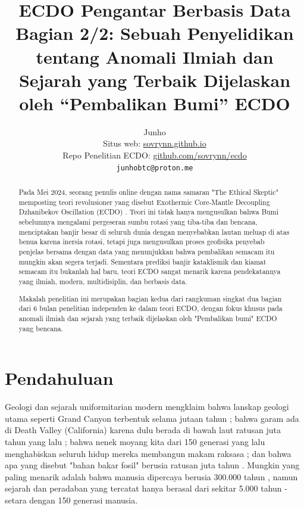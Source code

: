 \documentclass[10pt,twocolumn,letterpaper]{article}
\begin{document}
\title{ECDO Pengantar Berbasis Data Bagian 2/2: Sebuah Penyelidikan tentang Anomali Ilmiah dan Sejarah yang Terbaik Dijelaskan oleh “Pembalikan Bumi” ECDO}

\author{Junho\\
Situs web: \href{https://sovrynn.github.io}{sovrynn.github.io}\\
Repo Penelitian ECDO: \href{https://github.com/sovrynn/ecdo}{github.com/sovrynn/ecdo}\\
{\tt\small junhobtc@proton.me}
}

\maketitle

\begin{abstract}
Pada Mei 2024, seorang penulis online dengan nama samaran "The Ethical Skeptic" \cite{0} memposting teori revolusioner yang disebut Exothermic Core-Mantle Decoupling Dzhanibekov Oscillation (ECDO) \cite{1}. Teori ini tidak hanya mengusulkan bahwa Bumi sebelumnya mengalami pergeseran sumbu rotasi yang tiba-tiba dan bencana, menciptakan banjir besar di seluruh dunia dengan menyebabkan lautan meluap di atas benua karena inersia rotasi, tetapi juga mengusulkan proses geofisika penyebab penjelas bersama dengan data yang menunjukkan bahwa pembalikan semacam itu mungkin akan segera terjadi. Sementara prediksi banjir kataklismik dan kiamat semacam itu bukanlah hal baru, teori ECDO sangat menarik karena pendekatannya yang ilmiah, modern, multidisiplin, dan berbasis data.

Makalah penelitian ini merupakan bagian kedua dari rangkuman singkat dua bagian dari 6 bulan penelitian independen \cite{2,20} ke dalam teori ECDO, dengan fokus khusus pada anomali ilmiah dan sejarah yang terbaik dijelaskan oleh "Pembalikan bumi" ECDO yang bencana.

\end{abstract}


\section{Pendahuluan}

Geologi dan sejarah uniformitarian modern mengklaim bahwa lanskap geologi utama seperti Grand Canyon terbentuk selama jutaan tahun \cite{143}; bahwa garam ada di Death Valley (California) karena dulu berada di bawah laut ratusan juta tahun yang lalu \cite{144}; bahwa nenek moyang kita dari 150 generasi yang lalu menghabiskan seluruh hidup mereka membangun makam raksasa \cite{29,70}; dan bahwa apa yang disebut "bahan bakar fosil" berusia ratusan juta tahun \cite{104}. Mungkin yang paling menarik adalah bahwa manusia dipercaya berusia 300.000 tahun \cite{145}, namun sejarah dan peradaban yang tercatat hanya berasal dari sekitar 5.000 tahun - setara dengan 150 generasi manusia.
\end{document}
